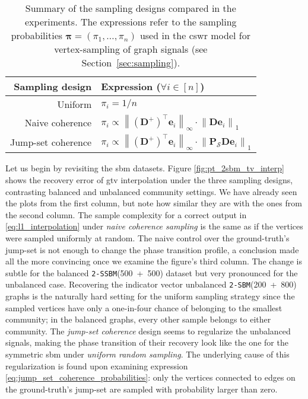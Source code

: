 \begin{table}[H]
    \centering
    \begin{tabularx}{0.6\textwidth}{rl}
        \hline
        Sampling design & Expression ($\forall i \in [n]$) \\
        \hline
        Uniform & $\pi_i = 1/n$ \\
        Naive coherence & $\pi_i \propto \left \| (\mathbf{D}^{+})^\top \mathbf{e}_i \right \|_{\infty} \cdot \left \| \mathbf{D} \mathbf{e}_i \right \|_1$ \\
        Jump-set coherence & $\pi_i \propto \left \| (\mathbf{D}^{+})^\top \mathbf{e}_i \right \|_{\infty} \cdot \left \| \mathbf{P}_\mathcal{S} \mathbf{D} \mathbf{e}_i \right \|_1$ \\
        \hline
    \end{tabularx}
    \caption[Summary of the three sampling designs compared in the experiments]{Summary of the sampling designs compared in the experiments. The expressions refer to the sampling probabilities $\bm{\pi} = (\pi_1, \dots, \pi_n)$ used in the \acrshort{cswr} model for vertex-sampling of graph signals (see Section~\ref{sec:sampling}).}
    \label{tab:summary_sampling_designs}
\end{table}

Let us begin by revisiting the \acrshort{sbm} datasets. Figure \ref{fig:pt_2sbm_tv_interp} shows the recovery error of \acrshort{gtv} interpolation under the three sampling designs, contrasting balanced and unbalanced community settings. We have already seen the plots from the first column, but note how similar they are with the ones from the second column. The sample complexity for a correct output in \eqref{eq:l1_interpolation} under \emph{naive coherence sampling} is the same as if the vertices were sampled uniformly at random. The naive control over the ground-truth's jump-set is not enough to change the phase transition profile, a conclusion made all the more convincing once we examine the figure's third column. The change is subtle for the balanced \texttt{2-SSBM}(500~+~500) dataset but very pronounced for the unbalanced case. Recovering the indicator vector unbalanced \texttt{2-SBM}(200~+~800) graphs is the naturally hard setting for the uniform sampling strategy since the sampled vertices have only a one-in-four chance of belonging to the smallest community; in the balanced graphs, every other sample belongs to either community. The \emph{jump-set coherence} design seems to regularize the unbalanced signals, making the phase transition of their recovery look like the one for the symmetric \acrshort{sbm} under \emph{uniform random sampling}. The underlying cause of this regularization is found upon examining expression \eqref{eq:jump_set_coherence_probabilities}: only the vertices connected to edges on the ground-truth's jump-set are sampled with probability larger than zero.

